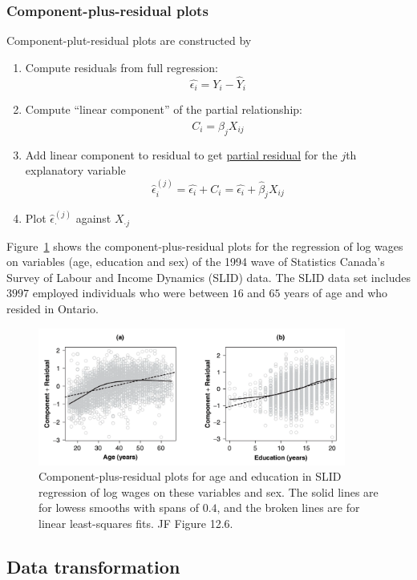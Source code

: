 \subsubsection*{Component-plus-residual plots}
Component-plut-residual plots are constructed by
\begin{enumerate}
  \item Compute residuals from full regression:
  $$
  \hat{\epsilon_i} = Y_i - \hat{Y}_i
  $$
  \item Compute ``linear component'' of the partial relationship:
  $$
  C_i = \hat{\beta}_j X_{ij}
  $$
  \item Add linear component to residual to get \underline{partial residual} for the $j$th explanatory variable
  $$
  \hat{\epsilon}_i^{(j)} = \hat{\epsilon_i} + C_i =  \hat{\epsilon_i} + \hat{\beta}_j X_{ij}
  $$
  \item  Plot $\hat{\epsilon}_\cdot^{(j)}$ against $X_{\cdot j}$
\end{enumerate}

Figure~\ref{fig:JF_12_6} shows the component-plus-residual plots for the regression of log wages on variables (age, education and sex) of the 1994 wave of Statistics Canada's Survey of Labour and Income Dynamics (SLID) data.
The SLID data set includes $3997$ employed individuals who were between $16$ and $65$ years of age and who resided in Ontario.
%
\begin{figure}[H]
\begin{center}
  \includegraphics[width=0.9\textwidth]{Lecture19/JF_12_6}
  \caption{
  Component-plus-residual plots for age and education in SLID regression of log wages on these variables and sex.
  The solid lines are for lowess smooths with spans of $0.4$, and the broken lines are for linear least-squares fits.
   JF Figure 12.6.}
  \label{fig:JF_12_6}
\end{center}
\end{figure}
%



\subsection*{Data transformation}

